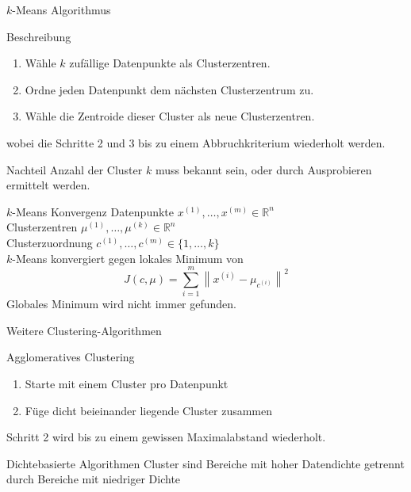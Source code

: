 \documentclass[xcolor={dvipsnames,svgnames},draft]{beamer}
\newcommand{\norm}[1]{\left\lVert#1\right\rVert}
\begin{document}
\begin{frame}{$k$-Means Algorithmus}

  \begin{block}{Beschreibung}
    \begin{enumerate}
    \item Wähle $k$ zufällige Datenpunkte als Clusterzentren.
    \item Ordne jeden Datenpunkt dem nächsten Clusterzentrum zu.
    \item Wähle die Zentroide dieser Cluster als neue Clusterzentren.
    \end{enumerate}
    wobei die Schritte 2 und 3 bis zu einem Abbruchkriterium wiederholt werden.
  \end{block}

  \begin{alertblock}{Nachteil}
    Anzahl der Cluster $k$ muss bekannt sein, oder durch Ausprobieren ermittelt werden.
  \end{alertblock}
\end{frame}

\begin{frame}{$k$-Means Konvergenz}
  Datenpunkte $x^{(1)}, \ldots, x^{(m)} \in \mathbb{R}^n$ \\ 
  Clusterzentren $\mu^{(1)},\ldots,\mu^{(k)} \in \mathbb{R}^n$ \\
  Clusterzuordnung $c^{(1)},\ldots,c^{(m)} \in \{1,\ldots,k\}$ \\
  \vspace{1em}
  $k$-Means konvergiert gegen lokales Minimum von
  \[
    J(c,\mu) = \sum_{i=1}^{m}\norm{x^{(i)} - \mu_{c^{(i)}}}^2
  \]
  Globales Minimum wird nicht immer gefunden.
\end{frame}

\begin{frame}{Weitere Clustering-Algorithmen}

  \begin{block}{Agglomeratives Clustering}
    \begin{enumerate}
      \item Starte mit einem Cluster pro Datenpunkt
      \item Füge dicht beieinander liegende Cluster zusammen
    \end{enumerate}
    Schritt 2 wird bis zu einem gewissen Maximalabstand wiederholt.
  \end{block}

  \begin{block}{Dichtebasierte Algorithmen}
    Cluster sind Bereiche mit hoher Datendichte getrennt durch Bereiche mit
    niedriger Dichte
  \end{block}

\end{frame}
\end{document}
